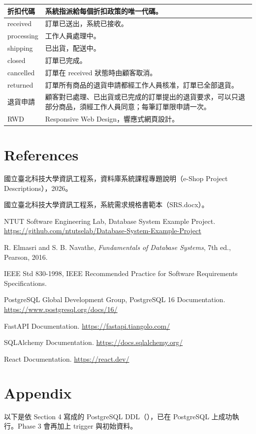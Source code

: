 \documentclass[12pt,a4paper]{article}
\newcommand{\at}[1]{\texttt{\detokenize{#1}}}
\begin{document}
\begin{xltabular}{\linewidth}{|>{\centering\arraybackslash}p{3.4cm}|X|}
折扣代碼 & 系統指派給每個折扣政策的唯一代碼。\\\hline
received & 訂單已送出，系統已接收。\\\hline
processing & 工作人員處理中。\\\hline
shipping & 已出貨，配送中。\\\hline
closed & 訂單已完成。\\\hline
cancelled & 訂單在 received 狀態時由顧客取消。\\\hline
returned & 訂單所有商品的退貨申請都經工作人員核准，訂單已全部退貨。\\\hline
退貨申請 & 顧客對已處理、已出貨或已完成的訂單提出的退貨要求，可以只退部分商品，須經工作人員同意；每筆訂單限申請一次。\\\hline
RWD & Responsive Web Design，響應式網頁設計。\\\hline
\end{xltabular}

\clearpage
\section*{References}

\begin{enumerate}[label={[\arabic*]},leftmargin=2.5em,itemsep=0.4em]
  \item 國立臺北科技大學資訊工程系，資料庫系統課程專題說明（e-Shop Project Descriptions），2026。
  \item 國立臺北科技大學資訊工程系，系統需求規格書範本（SRS.docx）。
  \item NTUT Software Engineering Lab, Database System Example Project. \url{https://github.com/ntutselab/Database-System-Example-Project}
  \item R. Elmasri and S. B. Navathe, \textit{Fundamentals of Database Systems}, 7th ed., Pearson, 2016.
  \item IEEE Std 830-1998, IEEE Recommended Practice for Software Requirements Specifications.
  \item PostgreSQL Global Development Group, PostgreSQL 16 Documentation. \url{https://www.postgresql.org/docs/16/}
  \item FastAPI Documentation. \url{https://fastapi.tiangolo.com/}
  \item SQLAlchemy Documentation. \url{https://docs.sqlalchemy.org/}
  \item React Documentation. \url{https://react.dev/}
\end{enumerate}

\clearpage
\section*{Appendix}

以下是依 Section 4 寫成的 PostgreSQL DDL（\at{schema.sql}），已在 PostgreSQL 上成功執行。Phase 3 會再加上 trigger 與初始資料。

\end{document}
